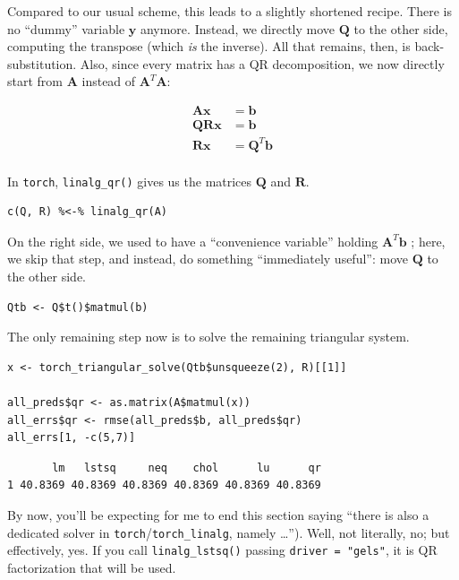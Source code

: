 \documentclass[
  letterpaper,
]{krantz}
\begin{document}
Compared to our usual scheme, this leads to a slightly shortened recipe.
There is no ``dummy'' variable \(\mathbf{y}\) anymore. Instead, we
directly move \(\mathbf{Q}\) to the other side, computing the transpose
(which \emph{is} the inverse). All that remains, then, is
back-substitution. Also, since every matrix has a QR decomposition, we
now directly start from \(\mathbf{A}\) instead of
\(\mathbf{A}^T\mathbf{A}\):

\[
\begin{aligned}
\mathbf{A}\mathbf{x} &= \mathbf{b}\\
\mathbf{Q}\mathbf{R}\mathbf{x} &= \mathbf{b}\\
\mathbf{R}\mathbf{x} &= \mathbf{Q}^T\mathbf{b}\\
\end{aligned}
\]

In \texttt{torch},
\texttt{linalg\_qr()} gives
us the matrices \(\mathbf{Q}\) and \(\mathbf{R}\).

\begin{verbatim}
c(Q, R) %<-% linalg_qr(A)
\end{verbatim}

On the right side, we used to have a ``convenience variable'' holding
\(\mathbf{A}^T\mathbf{b}\) ; here, we skip that step, and instead, do
something ``immediately useful'': move \(\mathbf{Q}\) to the other side.

\begin{verbatim}
Qtb <- Q$t()$matmul(b)
\end{verbatim}

The only remaining step now is to solve the remaining triangular system.

\begin{verbatim}
x <- torch_triangular_solve(Qtb$unsqueeze(2), R)[[1]]

all_preds$qr <- as.matrix(A$matmul(x))
all_errs$qr <- rmse(all_preds$b, all_preds$qr)
all_errs[1, -c(5,7)]
\end{verbatim}

\begin{verbatim}
       lm   lstsq     neq    chol      lu      qr
1 40.8369 40.8369 40.8369 40.8369 40.8369 40.8369 
\end{verbatim}

By now, you'll be expecting for me to end this section saying ``there is
also a dedicated solver in \texttt{torch}/\texttt{torch\_linalg}, namely
\ldots{}''). Well, not literally, no; but effectively, yes. If you call
\texttt{linalg\_lstsq()} passing \texttt{driver\ =\ "gels"}, it is QR
factorization that will be used.
\end{document}
